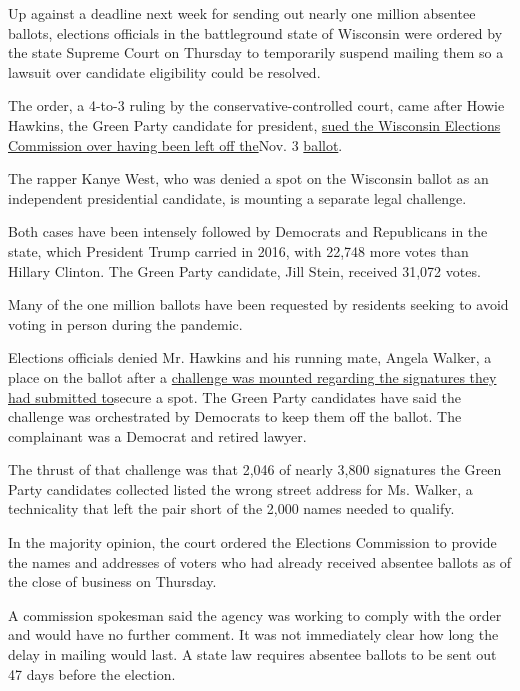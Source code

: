 Up against a deadline next week for sending out nearly one million
absentee ballots, elections officials in the battleground state of
Wisconsin were ordered by the state Supreme Court on Thursday to
temporarily suspend mailing them so a lawsuit over candidate eligibility
could be resolved.

The order, a 4-to-3 ruling by the conservative-controlled court, came
after Howie Hawkins, the Green Party candidate for president,
\href{https://howiehawkins.us/release-green-candidates-hawkins-and-walker-to-sue-wisconsin-for-ballot-access/}{sued
the Wisconsin Elections Commission over having been left off the}Nov. 3
\href{https://howiehawkins.us/release-green-candidates-hawkins-and-walker-to-sue-wisconsin-for-ballot-access/}{ballot}.

The rapper Kanye West, who was denied a spot on the Wisconsin ballot as
an independent presidential candidate, is mounting a separate legal
challenge.

Both cases have been intensely followed by Democrats and Republicans in
the state, which President Trump carried in 2016, with 22,748 more votes
than Hillary Clinton. The Green Party candidate, Jill Stein, received
31,072 votes.

Many of the one million ballots have been requested by residents seeking
to avoid voting in person during the pandemic.

Elections officials denied Mr. Hawkins and his running mate, Angela
Walker, a place on the ballot after a
\href{https://elections.wi.gov/sites/elections.wi.gov/files/2020-08/Challenge\%20Complaint_Arntsen\%20v.\%20Hawkins.pdf}{challenge
was mounted regarding the signatures they had submitted to}secure a
spot. The Green Party candidates have said the challenge was
orchestrated by Democrats to keep them off the ballot. The complainant
was a Democrat and retired lawyer.

The thrust of that challenge was that 2,046 of nearly 3,800 signatures
the Green Party candidates collected listed the wrong street address for
Ms. Walker, a technicality that left the pair short of the 2,000 names
needed to qualify.

In the majority opinion, the court ordered the Elections Commission to
provide the names and addresses of voters who had already received
absentee ballots as of the close of business on Thursday.

A commission spokesman said the agency was working to comply with the
order and would have no further comment. It was not immediately clear
how long the delay in mailing would last. A state law requires absentee
ballots to be sent out 47 days before the election.

